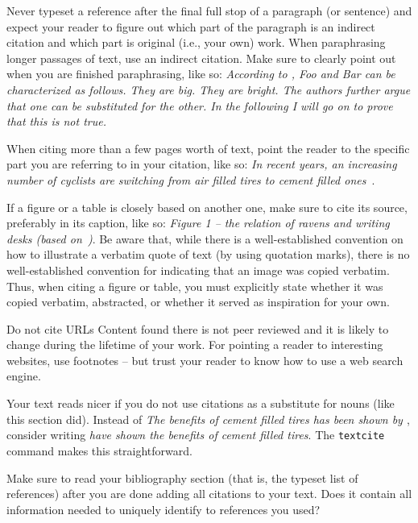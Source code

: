 Never typeset a reference after the final full stop of a paragraph (or sentence) and expect your reader to figure out which part of the paragraph is an indirect citation and which part is original (i.e., your own) work.
When paraphrasing longer passages of text, use an indirect citation.
Make sure to clearly point out when you are finished paraphrasing, like so:
\emph{According to \textcite{knuth1984complexity}, Foo and Bar can be characterized as follows.
They are big.
They are bright.
The authors further argue that one can be substituted for the other.
In the following I will go on to prove that this is not true.}

When citing more than a few pages worth of text, point the reader to the specific part you are referring to in your citation, like so:
\emph{In recent years, an increasing number of cyclists are switching from air filled tires to cement filled ones~\cite[Table IV]{upper1974unsuccessful}}.

If a figure or a table is closely based on another one, make sure to cite its source, preferably in its caption, like so:
\emph{Figure 1 -- the relation of ravens and writing desks (based on~\cite[Figure~42]{sommer2011bidirectionally})}.
Be aware that, while there is a well-established convention on how to illustrate a verbatim quote of text (by using quotation marks), there is no well-established convention for indicating that an image was copied verbatim.
Thus, when citing a figure or table, you must explicitly state whether it was copied verbatim, abstracted, or whether it served as inspiration for your own.

Do not cite URLs
Content found there is not peer reviewed and it is likely to change during the lifetime of your work.
For pointing a reader to interesting websites, use footnotes -- but trust your reader to know how to use a web search engine.

Your text reads nicer if you do not use citations as a substitute for nouns (like this section did).
Instead of \emph{The benefits of cement filled tires has been shown by \cite{hardes2019communication}}, consider writing \emph{\textcite{hardes2019communication} have shown the benefits of cement filled tires}.
The \texttt{textcite} command makes this straightforward.

Make sure to read your bibliography section (that is, the typeset list of references) after you are done adding all citations to your text.
Does it contain all information needed to uniquely identify to references you used?

